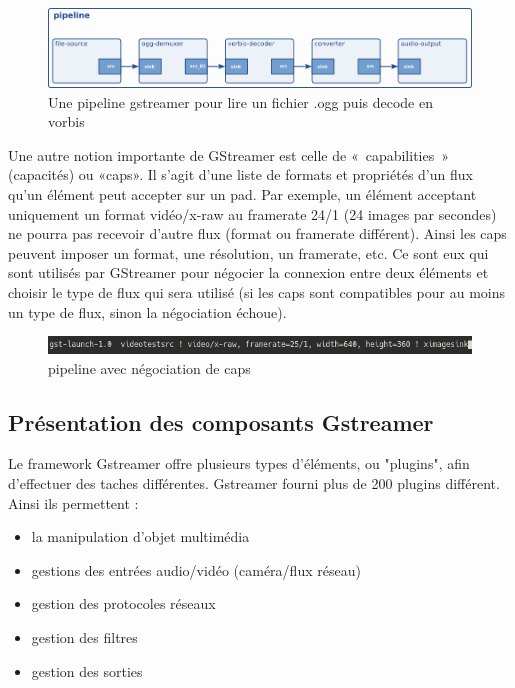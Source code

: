 \begin{figure}[!h]
  \centering
  \includegraphics[scale=0.5]{figures/pipeline_ogg}
  \caption{Une pipeline gstreamer pour lire un fichier .ogg puis decode en vorbis}
\end{figure}

Une autre notion importante de GStreamer est celle de « capabilities » (capacités) ou «caps». Il s'agit d'une liste de formats et propriétés d’un flux qu'un élément peut accepter sur un pad. Par exemple, un élément acceptant uniquement un format vidéo/x-raw au framerate 24/1 (24 images par secondes) ne pourra pas recevoir d'autre flux (format ou framerate différent). Ainsi les caps peuvent imposer un format, une résolution, un framerate, etc. Ce sont eux qui sont utilisés par GStreamer pour négocier la connexion entre deux éléments et choisir le type de flux qui sera utilisé (si les caps sont compatibles pour au moins un type de flux, sinon la négociation échoue).

\begin{figure}[!h]
  \centering
  \includegraphics[scale=0.9]{figures/caps_negociation}
  \caption{pipeline avec négociation de caps}
\end{figure}

\subsection{Présentation des composants Gstreamer}
Le framework Gstreamer offre plusieurs types d'éléments, ou "plugins", afin d'effectuer des taches différentes. Gstreamer fourni plus de 200 plugins différent. Ainsi ils permettent :
\begin{itemize}[label=$\bullet$]
 \item la manipulation d’objet multimédia
 \item gestions des entrées audio/vidéo (caméra/flux réseau)
 \item gestion des protocoles réseaux
 \item gestion des filtres
 \item gestion des sorties
\end{itemize}


